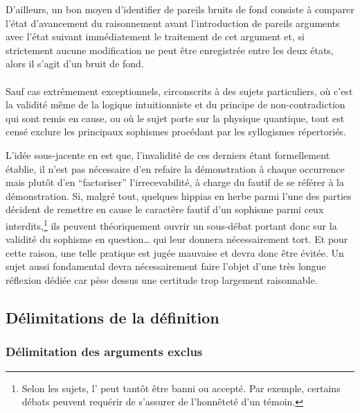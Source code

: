 D’ailleurs, un bon moyen d’identifier de pareils bruits de fond consiste à comparer l’état d’avancement du raisonnement avant l’introduction de pareils arguments avec l’état suivant immédiatement le traitement de cet argument et, si strictement aucune modification ne peut être enregistrée entre les deux états, alors il s’agit d’un bruit de fond.

\paragraph{}
Sauf cas extrêmement exceptionnels, circonscrits à des sujets particuliers, où c’est la validité même de la logique intuitionniste et du principe de non-contradiction qui sont remis en cause, ou où le sujet porte sur la physique quantique, tout \mainabbr{} est censé exclure les principaux sophismes procédant par les syllogismes répertoriés.


L’idée sous-jacente en est que, l’invalidité de ces derniers étant formellement établie, il n’est pas nécessaire d’en refaire la démonstration à chaque occurrence mais plutôt d’en \enquote{factoriser} l’irrecevabilité, à charge du fautif de se référer à la démonstration. Si, malgré tout, quelques hippias en herbe parmi l’une des parties décident de remettre en cause le caractère fautif d’un sophisme parmi ceux interdits,\footnote{Selon les sujets, l’ peut tantôt être banni ou accepté. Par exemple, certains débats peuvent requérir de s’assurer de l’honnêteté d’un témoin.} ils peuvent théoriquement ouvrir un sous-débat portant donc sur la validité du sophisme en question… qui leur donnera nécessairement tort. Et pour cette raison, une telle pratique est jugée mauvaise et devra donc être évitée. Un sujet aussi fondamental devra nécessairement faire l’objet d’une très longue réflexion dédiée car pèse dessus une certitude trop largement raisonnable.

\subsection{Délimitations de la définition}
\subsubsection{Délimitation des arguments exclus}
